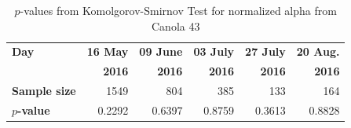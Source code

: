 \documentclass[journal]{IEEEtran}
\begin{document}
\begin{table}[hbt]
  \centering
  \caption{$p$-values from Komolgorov-Smirnov Test for normalized alpha from Canola 43}
  \label{tab:pvalues_alpha_cn43}
  \begin{tabular}{lrrrrr}
    \toprule
    \textbf{Day} & \textbf{16 May} & \textbf{09 June} & \textbf{03 July} & \textbf{27 July} & \textbf{20 Aug.}\\ 
                 & \textbf{2016} & \textbf{2016} & \textbf{2016} & \textbf{2016} & \textbf{2016}\\\midrule
    \textbf{Sample size} & 1549 & 804 & 385 & 133 & 164\\
    \textbf{$p$-value} & 0.2292 & 0.6397 & 0.8759 & 0.3613 & 0.8828\\
    \bottomrule
  \end{tabular}
\end{table}
\end{document}
